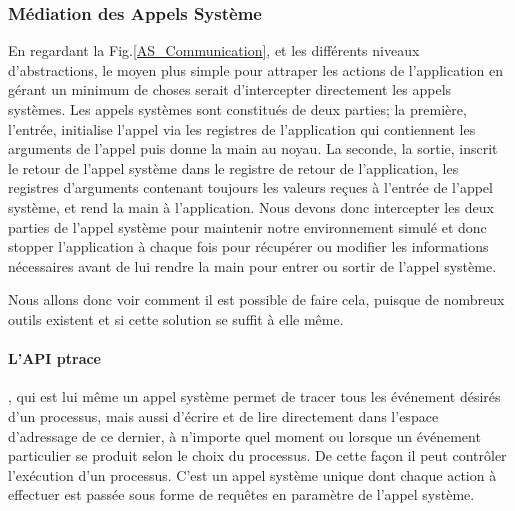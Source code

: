     

\subsubsection{Médiation des Appels Système}

En regardant la Fig.\ref{AS_Communication}, et les différents niveaux
d'abstractions, le moyen plus simple pour attraper les actions de l'application
en gérant un minimum de choses serait d'intercepter directement les appels
systèmes.  Les appels systèmes sont constitués de deux parties; la première,
l'entrée, initialise l'appel via les registres de l'application qui contiennent
les arguments de l'appel puis donne la main au noyau. La seconde, la sortie,
inscrit le retour de l'appel système dans le registre de retour de
l'application, les registres d'arguments contenant toujours les valeurs reçues à
l'entrée de l'appel système, et rend la main à l'application. Nous devons donc
intercepter les deux parties de l'appel système pour maintenir notre
environnement simulé et donc stopper l'application à chaque fois pour récupérer
ou modifier les informations nécessaires avant de lui rendre la main pour entrer
ou sortir de l'appel système.

 Nous allons donc voir comment il est possible de faire cela, puisque de
 nombreux outils existent {\color{red}et si cette solution se suffit à elle
   même.}
 
 \paragraph{L'API ptrace}\cite{INTERCEPTION:AS, INTERCEPTION:MARION},
 qui est lui même un appel système permet de tracer tous les événement désirés
 d'un processus, mais aussi d'écrire et de lire directement dans l'espace
 d'adressage de ce dernier, à n'importe quel moment ou lorsque un événement
 particulier se produit selon le choix du processus. De cette façon il peut
 contrôler l'exécution d'un processus. C'est un appel système unique dont chaque
 action à effectuer est passée sous forme de requêtes en paramètre de l'appel
 système.

